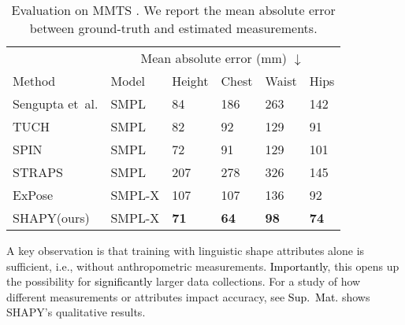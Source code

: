 \documentclass[10pt,twocolumn,letterpaper]{article}
\newcommand{\modelCOLOR}{black}
\newcommand{\modelname}{{\color{\modelCOLOR}SHAPY}\xspace}
\newcommand{\expose}{\mbox{ExPose}\xspace}
\newcommand{\straps}{\mbox{STRAPS}\xspace}
\newcommand{\tuch}{\mbox{TUCH}\xspace}
\newcommand{\mmts}{MMTS\xspace}
\newcommand{\vspaceTABaboveCaption}{-0.0 em}
\newcommand{\spin}{\mbox{SPIN}\xspace}
\newcommand{\smplx}{\mbox{SMPL-X}\xspace}
\newcommand{\groundtruth}{\mbox{ground-truth}\xspace}
\newcommand{\smpl}{\mbox{SMPL}\xspace}
\newcommand{\supmat}{{\mbox{\textcolor{black}{Sup.~Mat.}}}\xspace}
\renewcommand{\etal}{\mbox{et al.}\xspace}
\renewcommand{\ie}{\mbox{i.e.}\xspace}
\newcommand{\cameraready}[1]{\textcolor{Fuchsia}{{#1}}\xspace}
\renewcommand{\cameraready}[1]{\textcolor{black}{{#1}}\xspace}
\newcommand{\myarraystretch}[0]{1.1}
\newcommand{\colorTERM}{blue}
\renewcommand{\colorTERM}{black}
\newcommand{\measurements}[0]{{\color{\colorTERM}anthropometric measurements}\xspace}
\newcommand{\linguisticshapeattributes}[0]{{\color{\colorTERM}linguistic shape attributes}\xspace}
\begin{document}
 \begin{table}
\renewcommand{\arraystretch}{\myarraystretch} 
    \centering
    \scriptsize
    \begin{tabular}{llllll}
        \toprule
        & \multicolumn{5}{c}{Mean absolute error (mm) $\downarrow$}                                           \\
        Method                              & Model     & Height    & Chest     & Waist     & Hips          \\ 
        \midrule  Sengupta \etal \cite{sengupta2021hierarchicalICCV} & \smpl  & 84       & 186       & 263       & 142  \\
        \tuch \cite{mueller2021tuch}        & \smpl  &    82      &  92       &  129      &  91        \\
        \spin   \cite{Kolotouros2019_spin}  & \smpl     &  72    & 91     & 129      & 101      \\
        \straps \cite{sengupta2020straps}   & \smpl      &  207       &   278  &    326   &   145  \\ 
        \expose \cite{Choutas2020_expose}   & \smplx    & 107       & 107       & 136       & 92            \\
        \modelname (ours)                   & \smplx  & \textbf{71} & \textbf{64} & \textbf{98}  & \textbf{74}     \\
        \bottomrule
    \end{tabular}
    \vspace{\vspaceTABaboveCaption}
    \caption{
        Evaluation on \mmts
        .
        We report the mean absolute error between \groundtruth and estimated measurements.
    }
    \label{tab:measurements_test}
\end{table}
 

A key observation 
is that training with \linguisticshapeattributes alone is sufficient, \ie, without \measurements.
\cameraready{Importantly}, this opens up the possibility for \cameraready{significantly} larger data collections. For a study of how different measurements or attributes impact accuracy, see \supmat
{} shows \modelname's qualitative results.


  
\vfill
\end{document}
